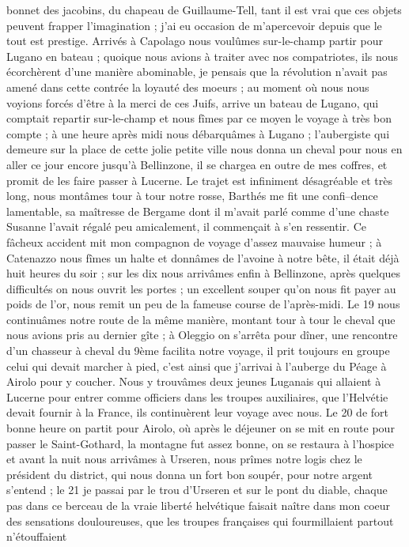 \documentclass[12pt]{article}
\begin{document}
 bonnet des jacobins, du chapeau de
Guillaume-Tell, tant il est vrai que ces objets peuvent frapper l’imagination ; j’ai eu occasion de
m’apercevoir depuis que le tout est prestige. Arrivés à Capolago nous voulûmes sur-le-champ partir
pour Lugano en bateau ; quoique nous avions à traiter avec nos compatriotes, ils nous écorchèrent
d’une manière abominable, je pensais que la révolution n’avait pas amené dans cette contrée la
loyauté des moeurs ; au moment où nous nous voyions forcés d’être à la merci de ces Juifs, arrive un
bateau de Lugano, qui comptait repartir sur-le-champ et nous fîmes par ce moyen le voyage à très bon
compte ; à une heure après midi nous débarquâmes à Lugano ; l’aubergiste qui demeure sur la place de
cette jolie petite ville nous donna un cheval pour nous en aller ce jour encore jusqu’à Bellinzone,
il se chargea en outre de mes coffres, et promit de les faire passer à Lucerne. Le trajet est
infiniment désagréable et très long, nous montâmes tour à tour notre rosse, Barthés me fit une
confi–dence lamentable, sa maîtresse de Bergame dont il m’avait parlé comme d’une chaste Susanne
l’avait régalé peu amicalement, il commençait à s’en ressentir. Ce fâcheux accident mit mon
compagnon de voyage d’assez mauvaise humeur ; à Catenazzo nous fîmes un halte et donnâmes de
l’avoine à notre bête, il était déjà huit heures du soir ; sur les dix nous arrivâmes enfin à
Bellinzone, après quelques difficultés on nous ouvrit les portes ; un excellent souper qu’on nous
fit payer au poids de l’or, nous remit un peu de la fameuse course de l’après-midi. Le 19 nous
continuâmes notre route de la même manière, montant tour à tour le cheval que nous avions pris au
dernier gîte ; à Oleggio on s’arrêta pour dîner, une rencontre d’un chasseur à cheval du 9ème
facilita notre voyage, il prit toujours en groupe celui qui devait marcher à pied, c’est ainsi que
j’arrivai à l’auberge du Péage à Airolo pour y coucher. Nous y trouvâmes deux jeunes Luganais qui
allaient à Lucerne pour entrer comme officiers dans les troupes auxiliaires, que l’Helvétie devait
fournir à la France, ils continuèrent leur voyage avec nous. Le 20 de fort bonne heure on partit
pour Airolo, où après le déjeuner on se mit en route pour passer le Saint-Gothard, la montagne fut
assez bonne, on se restaura à l’hospice et avant la nuit nous arrivâmes à Urseren, nous prîmes notre
logis chez le président du district, qui nous donna un fort bon soupér, pour notre argent s’entend ;
le 21 je passai par le trou d’Urseren et sur le pont du diable, chaque pas dans ce berceau de la
vraie liberté helvétique faisait naître dans mon coeur des sensations douloureuses, que les troupes
françaises qui fourmillaient partout n’étouffaient
\end{document}
